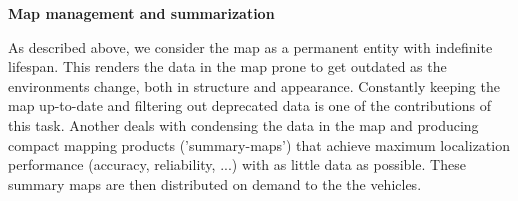 {\begin{tasks}{\WPMappingNo}
\item {\bf Map management and summarization}
\label{task:wpmaloc:summary}
\taskpartners{\ETHZ}{\IBM}

As described above, we consider the map as a permanent entity with indefinite lifespan. This renders the data in the map prone to get outdated as the environments change, both in structure and appearance. Constantly keeping the map up-to-date and filtering out deprecated data is one of the contributions of this task. Another deals with condensing the data in the map and producing compact mapping products ('summary-maps') that achieve maximum localization performance (accuracy, reliability, ...) with as little data as possible. These summary maps are then distributed on demand to the the vehicles. 


%

\end{tasks}







\begin{deliverables}{\WPMappingNo}

%   
%
%	


\end{deliverables}}
